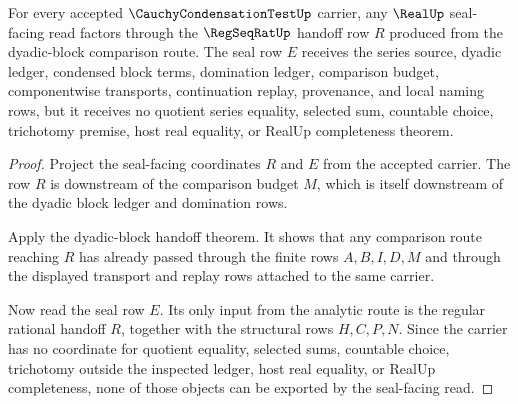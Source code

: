 \begin{theorem}
\label{thm:cauchy-condensation-test-real-seal-boundary}
For every accepted $\CauchyCondensationTestUp$ carrier, any $\RealUp$ seal-facing read factors through the $\RegSeqRatUp$ handoff row $R$ produced from the dyadic-block comparison route. The seal row $E$ receives the series source, dyadic ledger, condensed block terms, domination ledger, comparison budget, componentwise transports, continuation replay, provenance, and local naming rows, but it receives no quotient series equality, selected sum, countable choice, trichotomy premise, host real equality, or RealUp completeness theorem.
\end{theorem}
\begin{proof}
Project the seal-facing coordinates $R$ and $E$ from the accepted carrier. The row $R$ is downstream of the comparison budget $M$, which is itself downstream of the dyadic block ledger and domination rows.

Apply the dyadic-block handoff theorem. It shows that any comparison route reaching $R$ has already passed through the finite rows $A,B,I,D,M$ and through the displayed transport and replay rows attached to the same carrier.

Now read the seal row $E$. Its only input from the analytic route is the regular rational handoff $R$, together with the structural rows $H,C,P,N$. Since the carrier has no coordinate for quotient equality, selected sums, countable choice, trichotomy outside the inspected ledger, host real equality, or RealUp completeness, none of those objects can be exported by the seal-facing read.
\end{proof}




